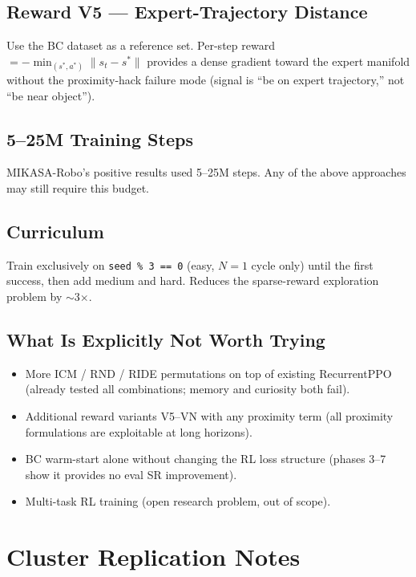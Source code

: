 \documentclass[11pt,letterpaper]{article}
\begin{document}
\subsection{Reward V5 — Expert-Trajectory Distance}

Use the BC dataset as a reference set. Per-step reward $= -\min_{(s^*, a^*)}
\|s_t - s^*\|$ provides a dense gradient toward the expert manifold without
the proximity-hack failure mode (signal is ``be on expert trajectory,'' not
``be near object'').

\subsection{5–25M Training Steps}

MIKASA-Robo's positive results used 5–25M steps. Any of the above approaches
may still require this budget.

\subsection{Curriculum}

Train exclusively on \texttt{seed \% 3 == 0} (easy, $N=1$ cycle only) until
the first success, then add medium and hard. Reduces the sparse-reward
exploration problem by $\sim$3$\times$.

\subsection{What Is Explicitly Not Worth Trying}

\begin{itemize}[nosep]
  \item More ICM / RND / RIDE permutations on top of existing RecurrentPPO
        (already tested all combinations; memory and curiosity both fail).
  \item Additional reward variants V5–VN with any proximity term (all proximity
        formulations are exploitable at long horizons).
  \item BC warm-start alone without changing the RL loss structure (phases 3–7
        show it provides no eval SR improvement).
  \item Multi-task RL training (open research problem, out of scope).
\end{itemize}

\section{Cluster Replication Notes}
\label{sec:replication}
\end{document}
